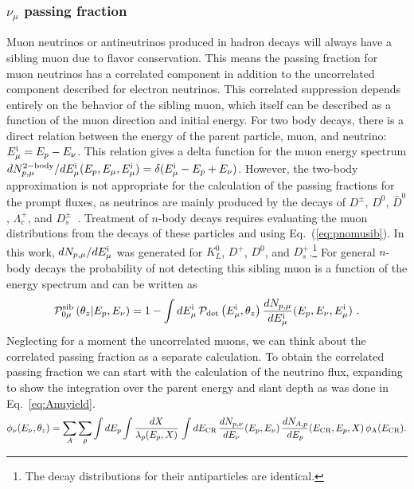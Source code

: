 \subsubsection{$\nu_\mu$ passing fraction}

Muon neutrinos or antineutrinos produced in hadron decays will always have a sibling muon due to flavor conservation.
This means the passing fraction for muon neutrinos has a correlated component in addition to the uncorrelated component described for electron neutrinos.
This correlated suppression depends entirely on the behavior of the sibling muon, which itself can be described as a function of the muon direction and initial energy.
For two body decays, there is a direct relation between the energy of the parent particle, muon, and neutrino: $E_{\mu}^{\rm i} = E_p - E_\nu$.
This relation gives a delta function for the muon energy spectrum $dN_{p,\mu}^{\rm 2-body}/dE_{\mu}^{\rm i} (E_p,E_\mu,E_{\mu}^{\rm i})=\delta(E_{\mu}^{\rm i}-E_p+E_\nu)$.
However, the two-body approximation is not appropriate for the calculation of the passing fractions for the prompt fluxes, as neutrinos are mainly produced by the decays of $D^{\pm}$, $D^0$, $\bar{D}^0$, $\Lambda_c^+$, and $D_s^{\pm}$~\cite{Fedynitch:2015zma}.
Treatment of $n$-body decays requires evaluating the muon distributions from the decays of these particles and using Eq.~(\ref{eq:pnomusib}).
In this work, $dN_{p, \mu}/dE_{\mu}^{\rm i}$ was generated for $K^0_L$, $D^+$, $D^0$, and $D^+_s$.\footnote{The decay distributions for their antiparticles are identical.}
For general $n$-body decays the probability of not detecting this sibling muon is a function of the energy spectrum and can be written as
\begin{equation}
\label{eq:pnomusib}
{\cal P}_{0\mu}^{\rm sib} \left(\theta_z|E_p, E_\nu \right) = 1 - \int dE_{\mu}^{\rm i} \, {\cal P}_{\rm det}\left(E_{\mu}^{\rm i}, \theta_z\right) \frac{dN_{p, \mu}}{dE_{\mu}^{\rm i}}(E_p, E_\nu, E_{\mu}^{\rm i}) ~.
\end{equation}
Neglecting for a moment the uncorrelated muons, we can think about the correlated passing fraction as a separate calculation.
To obtain the correlated passing fraction we can start with the calculation of the neutrino flux, expanding to show the integration over the parent energy and slant depth as was done in Eq.~\ref{eq:Anuyield}.
\begin{equation}
\label{eq:nufluxcorexpanded}
\phi_\nu(E_\nu, \theta_z) = \sum_A \sum_{p} \int dE_p  \int \frac{dX}{\lambda_p(E_p, X)} \, \int dE_{\rm CR} \, \frac{dN_{p, \nu}}{dE_\nu}(E_p, E_\nu) \, \frac{dN_{A, p}}{dE_p}(E_{\rm CR}, E_p, X) \, \phi_{\rm A} (E_{\rm CR}).
\end{equation}
